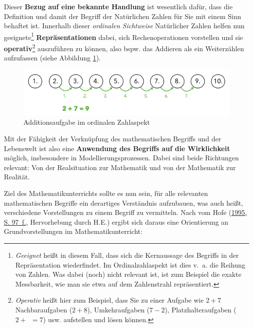 \documentclass[
]{scrbook}
\theoremstyle{definition}
\theoremstyle{definition}
\theoremstyle{definition}
\theoremstyle{definition}
\theoremstyle{remark}
\begin{document}
Dieser \textbf{Bezug auf eine bekannte Handlung} ist wesentlich dafür, dass die Definition und damit der Begriff der Natürlichen Zahlen für Sie mit einem Sinn behaftet ist. Innerhalb dieser \emph{ordinalen Sichtweise} Natürlicher Zahlen helfen nun geeignete\footnote{\emph{Geeignet} heißt in diesem Fall, dass sich die Kernaussage des Begriffs in der Repräsentation wiederfindet. Im Ordinalzahlaspekt ist dies v.~a. die Reihung von Zahlen. Was dabei (noch) nicht relevant ist, ist zum Beispiel die exakte Messbarkeit, wie man sie etwa auf dem Zahlenstrahl repräsentiert.} \textbf{Repräsentationen} dabei, sich Rechenoperationen vorstellen und sie \textbf{operativ}\footnote{\emph{Operativ} heißt hier zum Beispiel, dass Sie zu einer Aufgabe wie \(2+7\) Nachbaraufgaben (\(2+8\)), Umkehraufgaben (\(7-2\)), Platzhalteraufgaben (\(2+\boxed{\phantom{5}}=7\)) usw. aufstellen und lösen können.} auszuführen zu können, also bspw. das Addieren als ein Weiterzählen aufzufassen (siehe Abbildung \ref{fig:Addition}).

\begin{figure}

{\centering \includegraphics[width=0.75\linewidth]{pictures/3-Addition} 

}

\caption{Additionsaufgabe im ordinalen Zahlaspekt}\label{fig:Addition}
\end{figure}

Mit der Fähigkeit der Verknüpfung des mathematischen Begriffs und der Lebenswelt ist also eine \textbf{Anwendung des Begriffs auf die Wirklichkeit} möglich, insbesondere in Modellierungsprozessen. Dabei sind beide Richtungen relevant: Von der Realsituation zur Mathematik und von der Mathematik zur Realität.

Ziel des Mathematikunterrichts sollte es nun sein, für alle relevanten mathematischen Begriffe ein derartiges Verständnis aufzubauen, was auch heißt, verschiedene Vorstellungen zu einem Begriff zu vermitteln. Nach vom Hofe (\protect\hyperlink{ref-Hofe:1995}{1995, S. 97~f.}, Hervorhebung durch H.E.) ergibt sich daraus eine Orientierung an Grundvorstellungen im Mathematikunterricht:
\end{document}
